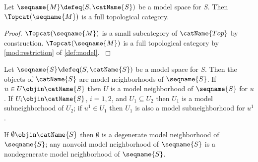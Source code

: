 \documentclass{article}
\begin{document}
\begin{lemma}
\label{lem:modtopcat}
Let $\seqname{M} \defeq (S, \catName{S})$ be a model space for $S$. Then
$\Topcat(\seqname{M})$ is a full topological category.
\begin{proof}
$\Topcat(\seqname{M})$ is a small subcategory of $\catName{Top}$ by
construction. $\Topcat(\seqname{M})$ is a full topological category by
\cref{mod:restriction} of
{
  \showlabelsinline
  \cref{def:model}.
}
\end{proof}
\end{lemma}

\begin{definition}
Let $\seqname{S} \defeq (S, \catName{S})$ be a model space for $S$.
Then the objects of $\catName{S}$ are model neighborhoods of
$\seqname{S}$. If $u \in U \objin \catName{S}$ then $U$ is a model
neighborhood of $\seqname{S}$ for $u$. If $U_i \objin \catName{S}$,
$i=1,2$, and $U_1 \subseteq U_2$ then $U_1$ is a model subneighborhood
of $U_2$; if $u^1 \in U_1$ then $U_1$ is also a model subneighborhood
for $u^1$.

If $\emptyset \objin \catName{S}$ then $\emptyset$ is a degenerate model
neighborhood of $\seqname{S}$; any nonvoid model neighborhood of
$\seqname{S}$ is a nondegenerate model neighborhood of $\seqname{S}$.
\end{definition}
\end{document}
